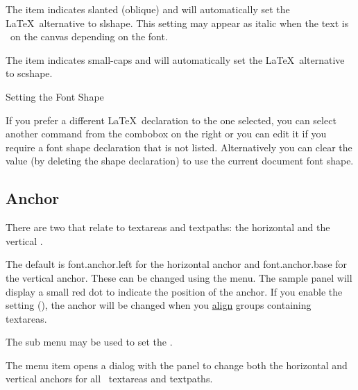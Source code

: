 
The  item indicates slanted (oblique) and
will automatically set the \LaTeX\ alternative to \gls{slshape}.
This setting may appear as italic when the text is
\rendered\ on the \gls{canvas} depending on the
font.


The  item indicates small-caps and
will automatically set the \LaTeX\ alternative to \gls{scshape}.

{}
{Setting the Font Shape}

If you prefer a different \LaTeX\ declaration to the one selected,
you can select another command from the \gls{combobox} on the right
or you can edit it if you require a font shape declaration that is
not listed.  Alternatively you can clear the value (by deleting the
shape declaration) to use the current document font shape.

\subsection{Anchor}\label{sec:fontanchor}

There are two 
that relate to \glspl{textarea} and \glspl{textpath}: the horizontal
 and the vertical .

The default is \gls{font.anchor.left} for the horizontal anchor and
\gls{font.anchor.base} for the vertical anchor. These can be changed
using the  menu. The sample panel will
display a small red dot to indicate the position of the anchor. If
you enable the  setting
(), the anchor will be changed when
you \hyperref[sec:alignobjects]{align} groups containing \glspl{textarea}.


The  sub menu may be used to set the
.


The  menu item opens a dialog
with the  panel to change both the horizontal
and vertical anchors for all \selected\ \glspl{textarea} and
\glspl{textpath}.

